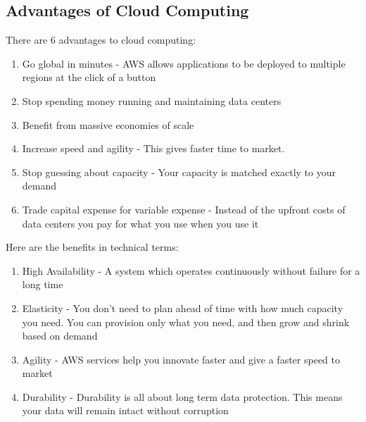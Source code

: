 \documentclass{article}%
\begin{document}
\subsection{Advantages of Cloud Computing}
There are 6 advantages to cloud computing: 
\begin{enumerate}
    \item Go global in minutes - AWS allows applications to be deployed to multiple regions at the click of a button
    \item Stop spending money running and maintaining data centers
    \item Benefit from massive economies of scale
    \item Increase speed and agility - This gives faster time to market.
    \item Stop guessing about capacity - Your capacity is matched exactly to your demand
    \item Trade capital expense for variable expense - Instead of the upfront costs of data centers you pay for what you use when you use it
\end{enumerate}
Here are the benefits in technical terms:
\begin{enumerate}
    \item High Availability - A system which operates continuously without failure for a long time
    \item Elasticity - You don't need to plan ahead of time with how much capacity you need. You can provision only what you need, and then grow and shrink based on demand
    \item Agility - AWS services help you innovate faster and give a faster speed to market
    \item Durability - Durability is all about long term data protection. This means your data will remain intact without corruption
\end{enumerate}
\end{document}
